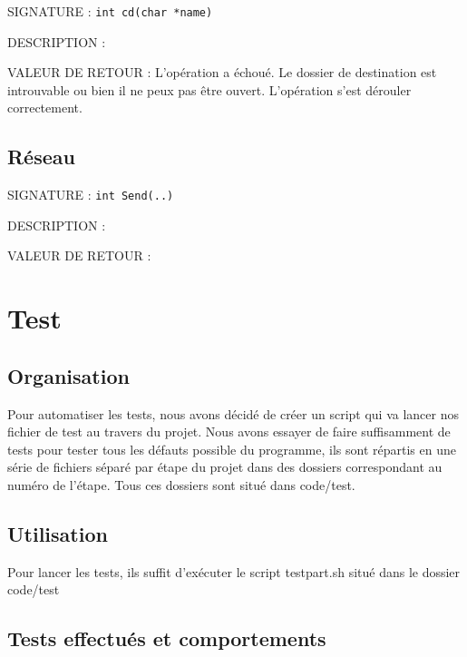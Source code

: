 \documentclass{article}
\begin{document}
		\vspace{2.5mm}
		\begin{description}
			\item{SIGNATURE : } \texttt{int cd(char *name)}
			\item{DESCRIPTION : } 
			\item{VALEUR DE RETOUR : } 
				 L'opération a échoué. Le dossier de destination est introuvable ou bien il ne peux pas être ouvert.
				 L'opération s'est dérouler correctement.
		\end{description}
		\vspace{2.5mm}
	
	\subsection{Réseau}
		\begin{description}
			\item{SIGNATURE : } \texttt{int Send(..)}
			\item{DESCRIPTION : } 
			\item{VALEUR DE RETOUR : } 
				\subitem{\texttt{-1} : } 
				\subitem{\texttt{-2} : } 
				\subitem{\texttt{-3} : } 
		\end{description}
		\vspace{2.5mm}

\section{Test}
	\subsection{Organisation}
		{Pour automatiser les tests, nous avons décidé de créer un script qui va lancer nos fichier de test au travers du projet.
		Nous avons essayer de faire suffisamment de tests pour tester tous les défauts possible du programme, ils sont répartis en une série de fichiers séparé par étape du projet dans des dossiers correspondant au numéro de l'étape. Tous ces dossiers sont situé dans code/test.}

	\subsection{Utilisation}
		{Pour lancer les tests, ils suffit d'exécuter le script testpart.sh situé dans le dossier code/test}

	\subsection{Tests effectués et comportements}
\end{document}
